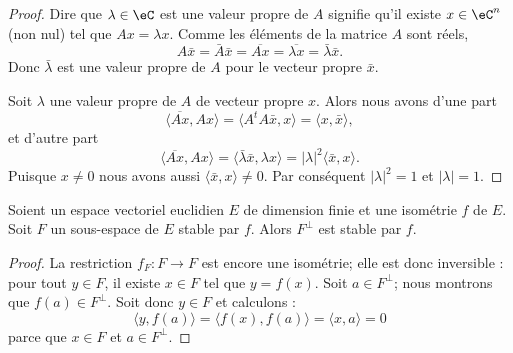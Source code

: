 \begin{proof}
	Dire que \( \lambda\in \eC\) est une valeur propre de \( A\) signifie qu'il existe \( x\in \eC^n\) (non nul) tel que \( Ax=\lambda x\). Comme les éléments de la matrice \( A\) sont réels,
	\begin{equation}
		A\bar x=\bar A\bar x=\overline{ Ax }=\overline{ \lambda x }=\bar \lambda\bar x.
	\end{equation}
	Donc \( \bar \lambda\) est une valeur propre de \( A\) pour le vecteur propre \( \bar x\).

	Soit \( \lambda\)  une valeur propre de \( A\) de vecteur propre \( x\). Alors nous avons d'une part
	\begin{equation}
		\langle \overline{ Ax }, Ax\rangle =\langle A^tA\bar x, x\rangle =\langle x, \bar x\rangle ,
	\end{equation}
	et d'autre part
	\begin{equation}
		\langle \overline{ Ax }, Ax\rangle =\langle \bar \lambda \bar x, \lambda x\rangle =| \lambda |^2\langle \bar x, x\rangle .
	\end{equation}
	Puisque \( x\neq 0\) nous avons aussi \( \langle \bar x, x\rangle \neq 0\). Par conséquent \( | \lambda |^2=1\) et \( | \lambda |=1\).
\end{proof}

\begin{lemma}        \label{LEMooNEDQooNRmASH}
	Soient un espace vectoriel euclidien \( E\) de dimension finie et une isométrie \( f\) de \( E\). Soit \( F\) un sous-espace de \( E\) stable par \( f\). Alors \( F^{\perp}\) est stable par \( f\).
\end{lemma}

\begin{proof}
	La restriction \( f_F\colon F\to F\) est encore une isométrie; elle est donc inversible : pour tout \( y\in F\), il existe \( x\in F\) tel que \( y=f(x)\). Soit \( a\in F^{\perp}\); nous montrons que \( f(a)\in F^{\perp}\). Soit donc \( y\in F\) et calculons :
	\begin{equation}
		\langle y, f(a)\rangle =\langle f(x), f(a)\rangle =\langle x,a \rangle =0
	\end{equation}
	parce que \( x\in F\) et \( a\in F^{\perp}\).
\end{proof}

